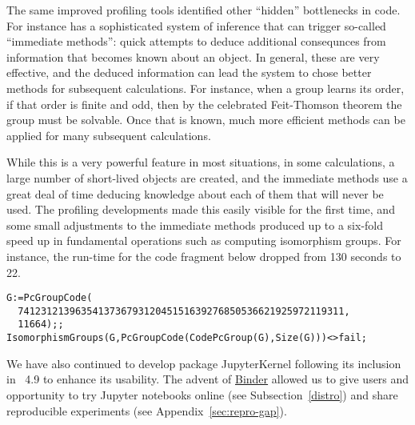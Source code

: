 %
%
%

The same improved profiling tools identified other
``hidden'' bottlenecks in \GAP code. For instance \GAP has a
sophisticated system of inference that can trigger 
so-called ``immediate methods'': quick attempts to deduce additional
consequnces from information that becomes known about an object.
In general, these are very effective, and the deduced information can
lead the system to chose better methods for subsequent
calculations. For instance, when a group learns its order, if that
order is finite and odd, then by the celebrated
Feit-Thomson theorem the group must be solvable. Once that
is known, much more efficient methods can be applied for many
subsequent calculations.

While this is a very powerful feature in most situations, in some
calculations, a large number of short-lived objects are created,
and the immediate methods use a great deal of time deducing knowledge
about each of them
that will never be used. The profiling developments made this 
easily visible for the first time, and some small adjustments to the
immediate methods produced up to a six-fold speed up in fundamental
operations such as computing isomorphism groups. For instance, the
run-time for the code fragment below dropped from 130
seconds to 22.


{\Small
\begin{verbatim}
G:=PcGroupCode( 
  741231213963541373679312045151639276850536621925972119311,
  11664);;
IsomorphismGroups(G,PcGroupCode(CodePcGroup(G),Size(G)))<>fail;
\end{verbatim}
}


We have also continued to develop package {\sf JupyterKernel} following 
its inclusion in \GAP~4.9 to enhance its usability. The advent of
\href{https://mybinder.org/}{Binder} allowed us to give users and 
opportunity to try \GAP Jupyter notebooks online (see Subsection~\ref{distro})
and share reproducible \GAP experiments (see Appendix~\ref{sec:repro-gap}).

